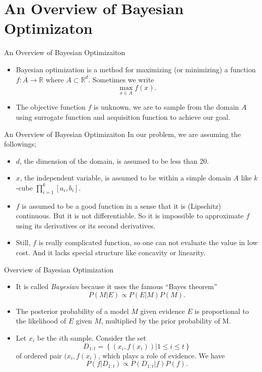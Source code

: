 \documentclass{beamer}
\begin{document}
\section{An Overview of Bayesian Optimizaton}
\begin{frame}{An Overview of Bayesian Optimizaiton}
\begin{itemize}
\item
Bayesian optimization is a method for maximizing (or minimizing) a function \(f:A\to\mathbb R\) where \(A\subset\mathbb R^d\).
Sometimes we write
\[\max_{x\in A}f(x).\]
\item
The \alert{objective function} \(f\) is unknown, we are to sample from the domain \(A\) using \alert{surrogate function} and \alert{acquisition function} to achieve our goal.
\end{itemize}
\end{frame}

%
\begin{frame}{An Overview of Bayesian Optimizaiton}
In our problem, we are assuming the followings;
\begin{itemize}
\item
\(d\), the dimension of the domain, is assumed to be less than 20.
\item
\(x\), the independent variable, is assumed to be within a simple domain \(A\) like \(k\)-cube \(\prod_{i=1}^k[a_i,b_i]\).
\item
\(f\) is assumed to be a good function in a sense that it is (Lipschitz) continuous.
But it is not differentiable.
So it is impossible to approximate \(f\) using its derivatives or its second derivatives.
\item
Still, \(f\) is really complicated function, so one can not evaluate the value in low cost.
And it lacks special structure like concavity or linearity.
\end{itemize}
\end{frame}

%
\begin{frame}{Overview of Bayesian Optimization}
\begin{itemize}
\item
It is called \emph{Bayesian} because it uses the famous ``Bayes theorem''
\[P(M|E)\propto P(E|M)P(M).\]
\item
The \alert{posterior} probability of a model \(M\) given \alert{evidence} \(E\) is proportional to the \alert{likelihood} of \(E\) given \(M\), multiplied by the \alert{prior} probability of M.
\item
Let \(x_i\) be the \(i\)th sample.
Consider the set
\[D_{1:t}=\left\{\left(x_i,f(x_i)\right)|1\le i\le t\right\}\]
of ordered pair \((x_i,f(x_i)\), which plays a role of evidence.
We have
\[P(f|D_{1:t})\propto P(D_{1:t}|f)P(f).\]
\end{itemize}
\end{frame}
\end{document}
